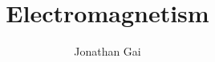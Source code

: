 
\usepackage{bbm}
\usepackage{nicefrac}
\author{Jonathan Gai}
\title{Electromagnetism}


\maketitle
\tableofcontents
{}
